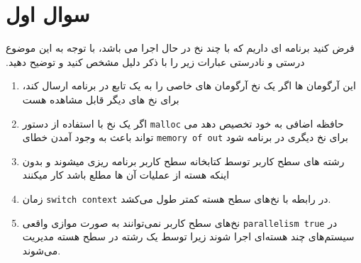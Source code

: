\section{سوال اول}




‫فرض‬ ‫کنید‬ ‫برنامه‬ ‫ای‬ ‫داریم‬ ‫که‬ ‫با‬ ‫چند‬ ‫نخ‬ ‫در‬ ‫حال‬ ‫اجرا‬ ‫می‬ ‫باشد‪،‬ ‫با‬ ‫توجه‬ ‫به‬ ‫این‬ ‫موضوع‬ ‫درستی‬ ‫و‬ ‫نادرستی‬ ‫عبارات‬ ‫زیر ‬‫را‬ ‫با‬ ‫ذکر‬ ‫دلیل‬ ‫مشخص‬ ‫کنید‬ ‫و‬ ‫توضیح‬ ‫دهید‬.‬‬
\begin{enumerate}
	\item ‫اگر‬ ‫یک‬ ‫نخ‬ ‫آرگومان‬ ‫های‬ ‫خاصی‬ ‫را‬ ‫به‬ ‫یک‬ ‫تابع‬ ‫در‬ ‫برنامه‬ ‫ارسال‬ ‫کند‪،‬‬ ‫این‬ ‫آرگومان‬ ‫ها‬ ‫برای‬ ‫نخ‬ ‫های‬ ‫دیگر‬ ‫قابل‬ مشاهده ‬‫هست‬
	
	\item ‫اگر‬ ‫یک‬ ‫نخ‬ ‫با‬ ‫استفاده‬ ‫از‬ ‫دستور‬ ‫‪\texttt{malloc}‬‬ ‫حافظه‬ ‫اضافی‬ ‫به‬ ‫خود‬ ‫تخصیص‬ ‫دهد‬ ‫می‬ ‫تواند ‬‫باعث‬ ‫به‬ ‫وجود‬ ‫آمدن‬ ‫خطای‬‫‪‬‬ \texttt{‫‪memory of out}‬‬ ‫برای‬ ‫نخ‬ ‫دیگری‬ ‫در‬ ‫برنامه‬ ‫شود‬


	\item ‫رشته‬ ‫های‬ ‫سطح‬ ‫کاربر‬ ‫توسط‬ ‫کتابخانه‬ ‫سطح‬ ‫کاربر‬ ‫برنامه‬ ‫ریزی‬‫ می‬شوند‬ ‫و‬ بدون‬ ‫اینکه‬ ‫هسته‬ ‫از‬ ‫عملیات‬ ‫آ‫ن ها‬ ‫مطلع‬ باشد ‬‫کار‬ ‫می‬‫کنند‬‬‬
	
	\item زمان \texttt{switch context} در رابطه با نخ‌های سطح هسته کمتر طول می‌کشد.
	
	
	\item نخ‌های سطح کاربر نمی‌توانند به صورت موازی واقعی \texttt{parallelism true} در سیستم‌های چند هسته‌ای اجرا شوند زیرا توسط یک رشته در سطح هسته مدیریت می‌شوند.
	
\end{enumerate}
